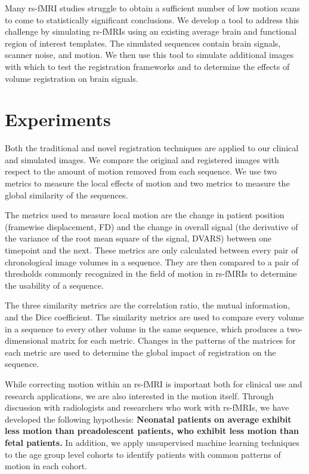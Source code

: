 Many rs-fMRI studies struggle to obtain a sufficient number of low motion scans to come to statistically significant conclusions. We develop a tool to address this challenge by simulating rs-fMRIs using an existing average brain and functional region of interest templates. The simulated sequences contain brain signals, scanner noise, and motion. We then use this tool to simulate additional images with which to test the registration frameworks and to determine the effects of volume registration on brain signals.

\section{Experiments}

Both the traditional and novel registration techniques are applied to our clinical and simulated images. We compare the original and registered images with respect to the amount of motion removed from each sequence. We use two metrics to measure the local effects of motion and two metrics to measure the global similarity of the sequences. 

The metrics used to measure local motion are the change in patient position (framewise displacement, FD) and the change in overall signal (the derivative of the variance of the root mean square of the signal, DVARS) between one timepoint and the next. These metrics are only calculated between every pair of chronological image volumes in a sequence. They are then compared to a pair of thresholds commonly recognized in the field of motion in rs-fMRIs to determine the usability of a sequence.

The three similarity metrics are the correlation ratio, the mutual information, and the Dice coefficient. The similarity metrics are used to compare every volume in a sequence to every other volume in the same sequence, which produces a two-dimensional matrix for each metric. Changes in the patterns of the matrices for each metric are used to determine the global impact of registration on the sequence.

While correcting motion within an rs-fMRI is important both for clinical use and research applications, we are also interested in the motion itself. Through discussion with radiologists and researchers who work with rs-fMRIs, we have developed the following hypothesis: \textbf{Neonatal patients on average exhibit less motion than preadolescent patients, who exhibit less motion than fetal patients.} In addition, we apply unsupervised machine learning techniques to the age group level cohorts to identify patients with common patterns of motion in each cohort.

